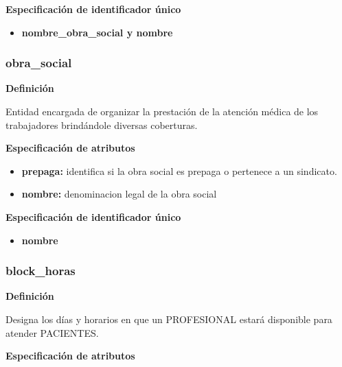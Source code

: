 \documentclass[a4paper,11pt]{article}
\begin{document}
\textbf{Especificación de identificador único}

\begin{itemize}

     \item \textbf{nombre\_obra\_social y nombre}


\end{itemize}

\subsubsection{\textbf{obra\_social}}

\textbf{Definición}

Entidad encargada de organizar la prestación de la atención médica de los 
trabajadores brindándole diversas coberturas.

\textbf{Especificación de atributos}

\begin{itemize}

     \item \textbf{prepaga:} identifica si la obra social es prepaga o pertenece a un sindicato.

     \item \textbf{nombre:} denominacion legal de la obra social

\end{itemize}

\textbf{Especificación de identificador único}

\begin{itemize}

     \item \textbf{nombre}

\end{itemize}

\subsubsection{\textbf{block\_horas}}

\textbf{Definición}

Designa los días y horarios en que un PROFESIONAL estará disponible para atender 
PACIENTES.

\textbf{Especificación de atributos}
\end{document}
